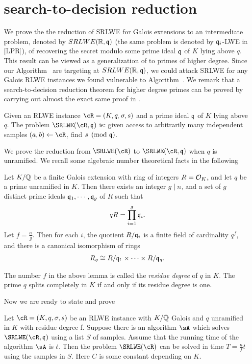 \documentclass{amsart}
\begin{document}
\section{search-to-decision reduction}

We prove the the reduction of SRLWE for Galois extensions to an intermediate problem, denoted by $SRLWE(\mathbb{R},\mathfrak{q})$ (the same problem is denoted by $\mathfrak{q}_i$-LWE in [LPR]), of recovering the secret modulo some prime ideal $\mathfrak{q}$ of $K $ lying above $q$. This result can be viewed as a generalization of \cite[Theorem 2]{eisentrager2014weak} to primes of higher degree. Since our Algorithm~ are targeting at $SRLWE(\mathbb{R},\mathfrak{q})$, we could attack SRLWE for any Galois RLWE instances we found vulnerable to Algorithm~. We remark that a search-to-decision reduction theorem for higher degree primes can be proved by carrying out almost the exact same proof in \cite{eisentrager2014weak}.

\begin{Definition}
Given an RLWE instance $\cR = (K,q,\sigma, s)$ and a prime ideal $\mathfrak{q}$ of $K$ lying above $q$. The problem $\SRLWE(\cR, \fq)$ is: given access to arbitrarily many independent samples $(a,b) \gets \cR$, find $s \pmod {\mathfrak{q}}$.
\end{Definition}

We prove the reduction from $\SRLWE(\cR)$ to $\SRLWE(\cR,\fq)$ when
$q$ is unramified. We recall some algebraic number theoretical facts in the following
\begin{Lemma}
Let $K/\mathbb{Q}$ be a finite Galois extension with ring of integers $R = \mathcal{O}_K$,  and let $q$ be a prime unramified in $K$. Then there exists an integer $g \mid n$, and a set of $g$ distinct prime ideals $\mathfrak{q}_1, \cdots ,\mathfrak{q}_g$ of
$R$ such that
\[
    qR = \prod_{i=1}^g \mathfrak{q}_i.
\]
Let $f = \frac{n}{g}$. Then for each $i$, the quotient $R/\mathfrak{q}_{i}$ is a finite field of cardinality $q^f$, and there is a canonical isomorphism of rings
\[
    R_q \cong R/\mathfrak{q}_{1} \times \cdots \times R/\mathfrak{q}_{g}.
\]
\end{Lemma}
The number $f$ in the above lemma is called the {\it residue degree} of $q$ in $K$. The prime $q$ splits completely in $K$ if and only if its residue degree is one.

Now we are ready to state and prove
\begin{theorem}
Let $\cR = (K,q,\sigma, s)$ be an RLWE instance with $K/\mathbb{Q}$ Galois and $q$ unramified in $K$ with residue degree f. Suppose there is an algorithm $\sA$ which solves $\SRLWE(\cR,\fq)$ using a list $S$ of samples. Assume that the running time of the algorithm $\sA$ is $t$. Then the problem $\SRLWE(\cR)$ can be solved in time $T = \frac{n}{f}t$ using the samples in $S$. Here $C$ is some constant depending on $K$.
\end{theorem}
\end{document}
